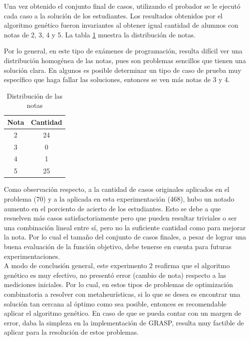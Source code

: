 \documentclass[a4paper,12pt]{book}
\begin{document}
	Una vez obtenido el conjunto final de casos, utilizando el probador se le ejecutó cada caso a la solución de los estudiantes. Los resultados obtenidos por el algoritmo genético fueron invariantes al obtener igual cantidad de alumnos con notas de 2, 3, 4 y 5. La tabla \ref{tab:Notas} muestra la distribución de notas.
	
	Por lo general, en este tipo de exámenes de programación, resulta difícil ver una distribución homogénea de las notas, pues son problemas sencillos que tienen una solución clara. En algunos es posible determinar un tipo de caso de prueba muy específico que haga fallar las soluciones, entonces se ven más notas de 3 y 4.
	
	\begin{table}[h]
		\begin{center}
			\begin{tabular}{| c | c |} \hline
				Nota & Cantidad \\ \hline
				2 & 24\\ 
				3 & 0 \\
				4 & 1 \\
				5 & 25 \\ \hline
			\end{tabular}
			\caption{Distribución de las notas}
			\label{tab:Notas}
		\end{center}
	\end{table}

	Como observación respecto, a la cantidad de casos originales aplicados en el problema (70) y a la aplicada en esta experimentación (468), hubo un notado aumento en el porciento de acierto de los estudiantes. Esto se debe a que resuelven más casos satisfactoriamente pero que pueden resultar triviales o ser una combinación lineal entre sí, pero no la suficiente cantidad como para mejorar la nota. Por lo cual el tamaño del conjunto de casos finales, a pesar de lograr una buena evaluación de la función objetivo, debe tenerse en cuenta para futuras experimentaciones. \\
	
	A modo de conclusión general, este experimento 2 reafirma que el algoritmo genético es muy efectivo, no presentó error (cambio de nota) respecto a las mediciones iniciales. Por lo cual, en estos tipos de problemas de optimización combinatoria a resolver con metaheurísticas, si lo que se desea es encontrar una solución tan cercana al óptimo como sea posible, entonces es recomendable aplicar el algoritmo genético. En caso de que se pueda contar con un margen de error, daba la simpleza en la implementación de GRASP, resulta muy factible de aplicar para la resolución de estos problemas.
	
\end{document}
